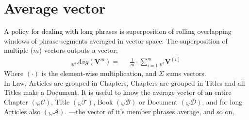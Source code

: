 \documentclass[a4paper,fleqn]{cas-sc}
\begin{document}
\section{Average vector}
A policy for dealing with long phrases is superposition of rolling overlapping windows of 
phrase segments averaged in vector space. The superposition of multiple ($m$) vectors outputs a vector: 
\begin{equation}
  \begin{split}
    {}_{\mathbb{R}^{d}}{Avg}\left(\mathbf{V}^{m}\right) =& \hspace{8pt} \frac{1}{m}\cdot{}\sum_{i=1}^{m} {}_{\mathbb{R}^{d}}\mathbf{V}^{(i)}
  \end{split}
\end{equation}
Where $(\cdot{})$ is the element-wise multiplication, and $\Sigma$ sums vectors. \\
\noindent
In Law, Articles are grouped in Chapters, Chapters are grouped in Titles and all Titles make a Document. 
It is useful to know the average vector of an entire Chapter $({}_{\mathbb{W}}\mathcal{C})$, 
Title $({}_{\mathbb{W}}\mathcal{T})$, Book $({}_{\mathbb{W}}\mathcal{B})$ or Document $({}_{\mathbb{W}}\mathcal{D})$, 
and for long Articles also $({}_{\mathbb{W}}\mathcal{A})$. 
---the vector of it's member phrases average, and so on, 
\end{document}
